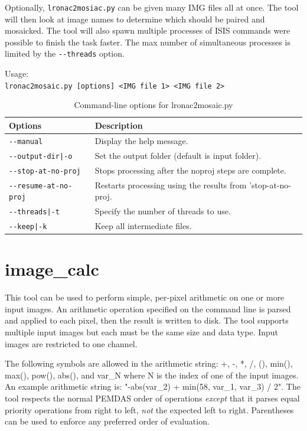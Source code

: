 Optionally, \texttt{lronac2mosiac.py} can be given many IMG files all
at once. The tool will then look at image names to determine which
should be paired and mosaicked. The tool will also spawn multiple
processes of ISIS commands were possible to finish the task
faster. The max number of simultaneous processes is limited by the
\texttt{-\/-threads} option.

\medskip

Usage:\\
\hspace*{2em}\texttt{lronac2mosaic.py [options] <IMG file 1> <IMG file 2>}

\medskip

\begin{longtable}{|l|p{10cm}|}
\caption{Command-line options for lronac2mosaic.py}
\label{tbl:lronac2mosaic}
\endfirsthead
\endhead
\endfoot
\endlastfoot
\hline
Options & Description \\ \hline \hline
\texttt{-\/-manual} & Display the help message.\\ \hline
\texttt{-\/-output-dir|-o} & Set the output folder (default is input folder).\\ \hline
\texttt{-\/-stop-at-no-proj} & Stops processing after the noproj steps are complete. \\ \hline
\texttt{-\/-resume-at-no-proj} & Restarts processing using the results from 'stop-at-no-proj. \\ \hline
\texttt{-\/-threads|-t} & Specify the number of threads to use.\\ \hline
\texttt{-\/-keep|-k} & Keep all intermediate files.\\ \hline
\end{longtable}


\section{image\_calc}
\label{imagecalc}

This tool can be used to perform simple, per-pixel arithmetic on one or more
input images. An arithmetic operation specified on the command line is parsed
and applied to each pixel, then the result is written to disk. The tool
supports multiple input images but each must be the same size and data type.
Input images are restricted to one channel.

The following symbols are allowed in the arithmetic string: +, -, *, /,
(), min(), max(), pow(), abs(), and var\_N where N is the index of one
of the input images. An example arithmetic string is: "-abs(var\_2) +
min(58, var\_1, var\_3) / 2".  The tool respects the normal PEMDAS order
of operations \textit{except} that it parses equal priority operations
from right to left, \textit{not} the expected left to right.
Parentheses can be used to enforce any preferred order of evaluation.


